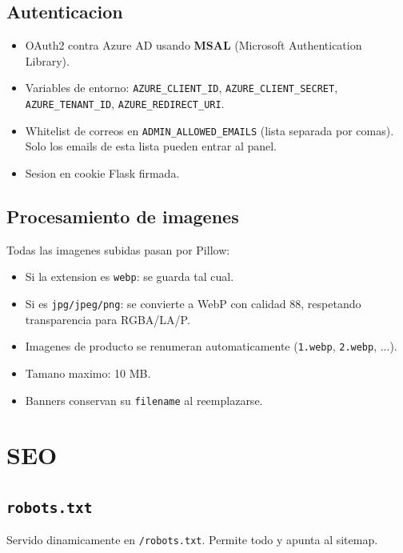 \documentclass[11pt,a4paper]{article}
\begin{document}
\subsection{Autenticacion}

\begin{itemize}[leftmargin=*]
    \item OAuth2 contra Azure AD usando \textbf{MSAL} (Microsoft
        Authentication Library).
    \item Variables de entorno: \texttt{AZURE\_CLIENT\_ID},
        \texttt{AZURE\_CLIENT\_SECRET}, \texttt{AZURE\_TENANT\_ID},
        \texttt{AZURE\_REDIRECT\_URI}.
    \item Whitelist de correos en \texttt{ADMIN\_ALLOWED\_EMAILS}
        (lista separada por comas). Solo los emails de esta lista pueden
        entrar al panel.
    \item Sesion en cookie Flask firmada.
\end{itemize}

\subsection{Procesamiento de imagenes}

Todas las imagenes subidas pasan por Pillow:

\begin{itemize}[leftmargin=*]
    \item Si la extension es \texttt{webp}: se guarda tal cual.
    \item Si es \texttt{jpg/jpeg/png}: se convierte a WebP con calidad 88,
        respetando transparencia para RGBA/LA/P.
    \item Imagenes de producto se renumeran automaticamente
        (\texttt{1.webp}, \texttt{2.webp}, ...).
    \item Tamano maximo: 10 MB.
    \item Banners conservan su \texttt{filename} al reemplazarse.
\end{itemize}

\section{SEO}

\subsection{\texttt{robots.txt}}
Servido dinamicamente en \texttt{/robots.txt}. Permite todo y apunta al
sitemap.
\end{document}
